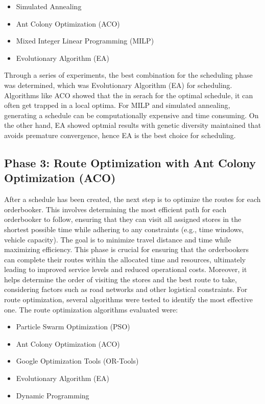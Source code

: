 \begin{itemize}
    \item Simulated Annealing
    \item Ant Colony Optimization (ACO)
    \item Mixed Integer Linear Programming (MILP)
    \item Evolutionary Algorithm (EA)
\end{itemize}

Through a series of experiments, the best combination for the scheduling phase was determined, which was Evolutionary Algorithm (EA) for scheduling.
Algorithms like ACO showed that the in serach for the optimal schedule, it can often get trapped in a local optima. For MILP and simulated annealing, 
generating a schedule can be computationally expensive and time consuming. On the other hand, EA showed optmial results with genetic diversity maintained that
avoids premature convergence, hence EA is the best choice for scheduling.

\subsection{Phase 3: Route Optimization with Ant Colony Optimization (ACO)}
After a schedule has been created, the next step is to optimize the routes for each orderbooker. This involves determining the most efficient path for each orderbooker to follow, ensuring that they can visit all assigned stores in the shortest possible time while adhering to any constraints (e.g., time windows, vehicle capacity). The goal is to minimize travel distance and time while maximizing efficiency.
This phase is crucial for ensuring that the orderbookers can complete their routes within the allocated time and resources, ultimately leading to improved service levels and reduced operational costs.
Moreover, it helps determine the order of visiting the stores and the best route to take, considering factors such as road networks and other logistical constraints.
For route optimization, several algorithms were tested to identify the most effective one. The route optimization algorithms evaluated were:

\begin{itemize}
    \item Particle Swarm Optimization (PSO)
    \item Ant Colony Optimization (ACO)
    \item Google Optimization Tools (OR-Tools)
    \item Evolutionary Algorithm (EA)
    \item Dynamic Programming
\end{itemize}

